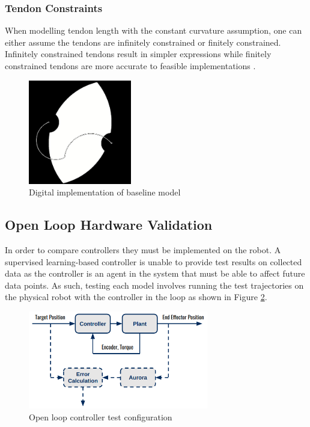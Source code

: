 
\subsubsection{Tendon Constraints}
When modelling tendon length with the constant curvature assumption, one can either assume the tendons are infinitely constrained or finitely constrained. Infinitely constrained tendons result in simpler expressions while finitely constrained tendons are more accurate to feasible implementations \cite{10.3389/frobt.2020.630245}. 


\begin{figure}[h]
    \centering
    \includegraphics[width=0.4\textwidth]{images/digital_model.png}
    \caption{Digital implementation of baseline model}
    \label{fig:digital_model}
\end{figure}


\subsection{Open Loop Hardware Validation}
In order to compare controllers they must be implemented on the robot. A supervised learning-based controller is unable to provide test results on collected data as the controller is an agent in the system that must be able to affect future data points. As such, testing each model involves running the test trajectories on the physical robot with the controller in the loop as shown in Figure \ref{fig:controller_test}. 

\begin{figure}[h]
    \centering
    \includegraphics[width=0.7\textwidth]{images/test_control_loop.png}
    \caption{Open loop controller test configuration}
    \label{fig:controller_test}
\end{figure}


